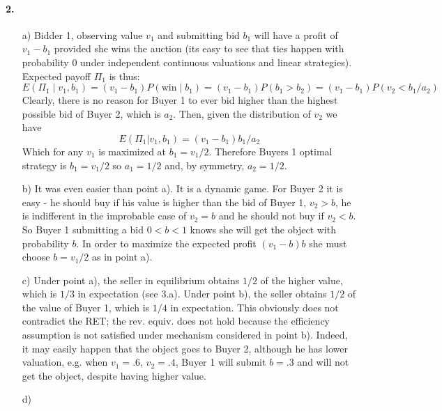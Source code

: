 \documentclass[a4paper,notitlepage,12pt]{article}
\begin{document}
\paragraph{2. }
\begin{enumerate}
\item[a)]
Bidder 1, observing value $v_1$ and submitting bid $b_1$ will have a profit of $v_1 - b_1$ provided she wins the auction (its easy to see that ties happen with probability 0 under independent continuous valuations and linear strategies). Expected payoff $\Pi_1$ is thus:
\[
E(\Pi_1 \mid v_1, b_1) = (v_1-b_1)P(\text{win}\mid b_1) = (v_1-b_1)P(b_1 > b_2) = (v_1-b_1)P(v_2 < b_1 / a_2)
\]
Clearly, there is no reason for Buyer 1 to ever bid higher than the highest possible bid of Buyer 2, which is $a_2$. Then, given the distribution of $v_2$ we have
\[
E(\Pi_1|v_1, b_1) = (v_1 - b_1) b_1 / a_2
\]
Which for any $v_1$ is maximized at $b_1 = v_1/2$. Therefore Buyers 1 optimal strategy is $b_1 = v_1/2$ so $a_1 = 1/2$ and, by symmetry, $a_2 = 1/2$.

\item[b)]
It was even easier than point a). It is a dynamic game. For Buyer 2 it is easy - he should buy if his value is higher than the bid of Buyer 1, $v_2 > b$, he is indifferent in the improbable case of $v_2 = b$ and he should not buy if $v_2 < b$. So Buyer 1 submitting a bid $0 < b < 1$ knows she will get the
object with probability $b$. In order to maximize the expected profit $(v_1 - b)b$ she must choose $b = v_1 /2$ as in point a).

\item[c)]
Under point a), the seller in equilibrium obtains $1/2$ of the higher value, which is $1/3$ in expectation (see 3.a). Under point b), the seller obtains $1/2$ of
the value of Buyer 1, which is $1/4$ in expectation. This obviously does not contradict the RET; the rev. equiv. does not hold because the efficiency assumption is not satisfied under mechanism considered in point b). Indeed, it may easily happen that the object goes to Buyer 2, although he has lower valuation, e.g. when $v_1 = .6$, $v_2 = .4$, Buyer 1 will submit $b = .3$ and will not get the object, despite having higher value.


\item[d)]


\end{enumerate}
\end{document}
